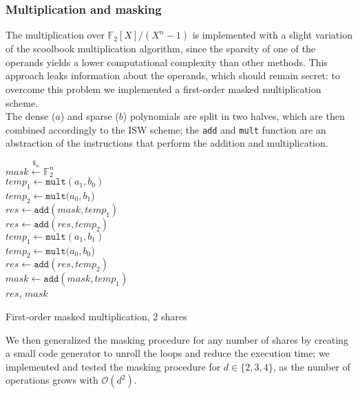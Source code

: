\subsubsection*{\textbf{Multiplication and masking}}
The multiplication over $\mathds{F}_2[X]/(X^n-1)$ is implemented with a slight variation of the scoolbook multiplication algorithm, since the sparsity of one of the operands yields a lower computational complexity than other methods.
This approach leaks information about the operands, which should remain secret: to overcome this problem we implemented a first-order masked multiplication scheme.\\

The dense ($a$) and sparse ($b$) polynomials are split in two halves, which are then combined accordingly to the ISW scheme; the \texttt{add} and \texttt{mult} function are an abstraction of the instructions that perform the addition and multiplication.

\begin{algorithm}
    \SetAlgoLined
    \BlankLine
    \BlankLine

    $mask \xleftarrow{\mathdollar_w} \mathds{F}_2^n$\\

    $temp_1 \leftarrow \texttt{mult}(a_1, b_0)$\\
    $temp_2 \leftarrow \texttt{mult}(a_0, b_1$)\\

    $res \leftarrow \texttt{add}(mask, temp_1)$\\
    $res \leftarrow \texttt{add}(res, temp_2)$\\

    $temp_1 \leftarrow \texttt{mult}(a_1, b_1)$\\
    $temp_2 \leftarrow \texttt{mult}(a_0, b_0$)\\

    $res \leftarrow \texttt{add}(res, temp_2)$\\
    $mask \leftarrow \texttt{add}(mask, temp_1)$\\

    \Return$res$, $mask$    
    \caption{First-order masked multiplication, 2 shares}
\end{algorithm}

We then generalized the masking procedure for any number of shares by creating a small code generator to unroll the loops and reduce the execution time;
we implemented and tested the masking procedure for $d \in \lbrace 2, 3, 4\rbrace$, as the number of operations grows with $\mathcal{O}(d^2)$.